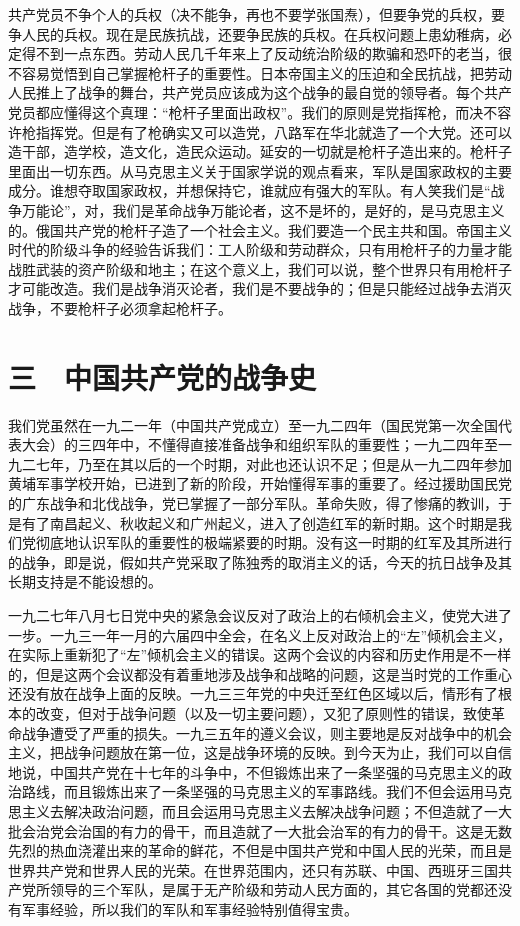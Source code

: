 共产党员不争个人的兵权（决不能争，再也不要学张国焘），但要争党的兵权，要争人民的兵权。现在是民族抗战，还要争民族的兵权。在兵权问题上患幼稚病，必定得不到一点东西。劳动人民几千年来上了反动统治阶级的欺骗和恐吓的老当，很不容易觉悟到自己掌握枪杆子的重要性。日本帝国主义的压迫和全民抗战，把劳动人民推上了战争的舞台，共产党员应该成为这个战争的最自觉的领导者。每个共产党员都应懂得这个真理：“枪杆子里面出政权”。我们的原则是党指挥枪，而决不容许枪指挥党。但是有了枪确实又可以造党，八路军在华北就造了一个大党。还可以造干部，造学校，造文化，造民众运动。延安的一切就是枪杆子造出来的。枪杆子里面出一切东西。从马克思主义关于国家学说的观点看来，军队是国家政权的主要成分。谁想夺取国家政权，并想保持它，谁就应有强大的军队。有人笑我们是“战争万能论”，对，我们是革命战争万能论者，这不是坏的，是好的，是马克思主义的。俄国共产党的枪杆子造了一个社会主义。我们要造一个民主共和国。帝国主义时代的阶级斗争的经验告诉我们：工人阶级和劳动群众，只有用枪杆子的力量才能战胜武装的资产阶级和地主；在这个意义上，我们可以说，整个世界只有用枪杆子才可能改造。我们是战争消灭论者，我们是不要战争的；但是只能经过战争去消灭战争，不要枪杆子必须拿起枪杆子。

\section{三　中国共产党的战争史}

我们党虽然在一九二一年（中国共产党成立）至一九二四年（国民党第一次全国代表大会）的三四年中，不懂得直接准备战争和组织军队的重要性；一九二四年至一九二七年，乃至在其以后的一个时期，对此也还认识不足；但是从一九二四年参加黄埔军事学校开始，已进到了新的阶段，开始懂得军事的重要了。经过援助国民党的广东战争和北伐战争，党已掌握了一部分军队。革命失败，得了惨痛的教训，于是有了南昌起义、秋收起义和广州起义，进入了创造红军的新时期。这个时期是我们党彻底地认识军队的重要性的极端紧要的时期。没有这一时期的红军及其所进行的战争，即是说，假如共产党采取了陈独秀的取消主义的话，今天的抗日战争及其长期支持是不能设想的。

一九二七年八月七日党中央的紧急会议反对了政治上的右倾机会主义，使党大进了一步。一九三一年一月的六届四中全会，在名义上反对政治上的“左”倾机会主义，在实际上重新犯了“左”倾机会主义的错误。这两个会议的内容和历史作用是不一样的，但是这两个会议都没有着重地涉及战争和战略的问题，这是当时党的工作重心还没有放在战争上面的反映。一九三三年党的中央迁至红色区域以后，情形有了根本的改变，但对于战争问题（以及一切主要问题），又犯了原则性的错误，致使革命战争遭受了严重的损失。一九三五年的遵义会议，则主要地是反对战争中的机会主义，把战争问题放在第一位，这是战争环境的反映。到今天为止，我们可以自信地说，中国共产党在十七年的斗争中，不但锻炼出来了一条坚强的马克思主义的政治路线，而且锻炼出来了一条坚强的马克思主义的军事路线。我们不但会运用马克思主义去解决政治问题，而且会运用马克思主义去解决战争问题；不但造就了一大批会治党会治国的有力的骨干，而且造就了一大批会治军的有力的骨干。这是无数先烈的热血浇灌出来的革命的鲜花，不但是中国共产党和中国人民的光荣，而且是世界共产党和世界人民的光荣。在世界范围内，还只有苏联、中国、西班牙三国共产党所领导的三个军队，是属于无产阶级和劳动人民方面的，其它各国的党都还没有军事经验，所以我们的军队和军事经验特别值得宝贵。

